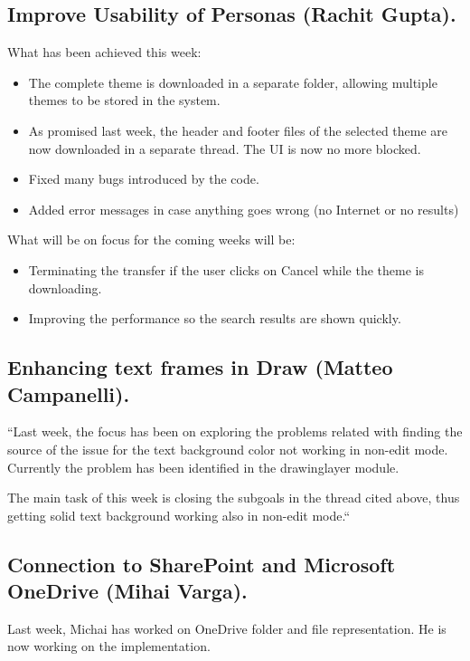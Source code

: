 \documentclass{article}
\begin{document}
\subsection{Improve Usability of Personas (Rachit Gupta).}

What has been achieved this week\cite{gsocPersona}:
\begin{itemize}
    \item The complete theme is downloaded in a separate folder, allowing multiple themes to be stored in the system.
    \item As promised last week, the header and footer files of the selected theme are now downloaded in a separate thread. The UI is now no more blocked.
    \item Fixed many bugs introduced by the code.
    \item Added error messages in case anything goes wrong (no Internet or no results)

\end{itemize}

What will be on focus for the coming weeks will be:
\begin{itemize}
    \item Terminating the transfer if the user clicks on Cancel while the theme is downloading.
    \item Improving the performance so the search results are shown quickly.
\end{itemize}

\subsection{Enhancing text frames in Draw (Matteo Campanelli).}

``Last week, the focus has been on exploring the problems related with finding the source of the issue for the text background color not working in non-edit mode.
Currently the problem has been identified in the drawinglayer module\cite{gsocTextFrameDrawMl}.

The main task of this week is closing the subgoals in the thread cited above, thus getting solid text background working also in non-edit mode.``\cite{gsocTextFrameDraw}

\subsection{Connection to SharePoint and Microsoft OneDrive (Mihai Varga).}

Last week, Michai has worked on OneDrive folder and file representation. He is now working on the implementation.\cite{gsocOneDrive}
\end{document}
